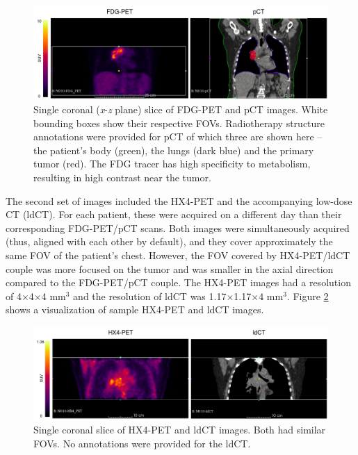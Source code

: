 \begin{figure}[h!]
    \centering
    \includegraphics[width=\linewidth]{figures/Data/original/N010-FDG_PET_pCT.png}
    \caption{Single coronal (\textit{x}-\textit{z} plane) slice of FDG-PET and pCT images. White bounding boxes show their respective FOVs. Radiotherapy structure annotations were provided for pCT of which three are shown here -- the patient's body (green), the lungs (dark blue) and the primary tumor (red). The FDG tracer has high specificity to metabolism, resulting in high contrast near the tumor.}
    \label{fig:original_fdgpet_pct}
\end{figure}

The second set of images included the HX4-PET and the accompanying low-dose CT (ldCT). For each patient, these were acquired on a different day than their corresponding FDG-PET/pCT scans. Both images were simultaneously acquired (thus, aligned with each other by default), and they cover approximately the same FOV of the patient's chest. However, the FOV covered by HX4-PET/ldCT couple was more focused on the tumor and was smaller in the axial direction compared to the FDG-PET/pCT couple. The HX4-PET images had a resolution of 4$\times$4$\times$4 mm$^3$ and the resolution of ldCT was 1.17$\times$1.17$\times$4 mm$^3$. Figure \ref{fig:original_hx4pet_ldct} shows a visualization of sample HX4-PET and ldCT images.

\begin{figure}[h!]
    \centering
    \includegraphics[width=\linewidth]{figures/Data/original/N010-HX4_PET_ldCT.png}
    \caption{Single coronal slice of HX4-PET and ldCT images. Both had similar FOVs. No annotations were provided for the ldCT.}
    \label{fig:original_hx4pet_ldct}
\end{figure}


